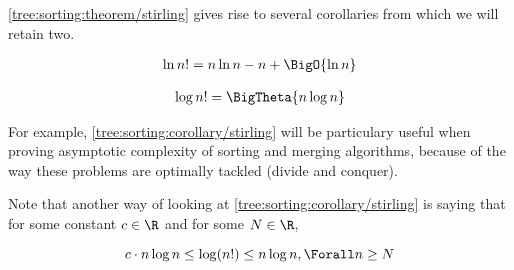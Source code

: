 \ref{tree:sorting:theorem/stirling} gives rise to several corollaries from
which we will retain two.

\begin{corollary}
\begin{align*}
\ln n! &= n \ln n - n + \BigO{\ln n}\\
\end{align*}
\end{corollary}

\begin{corollary}
\label{tree:sorting:corollary/stirling}
\begin{align*}
\log n! &= \BigTheta{n \log n}\\
\end{align*}
\end{corollary}


For example, \ref{tree:sorting:corollary/stirling} will be particulary useful
when proving asymptotic complexity of sorting and merging algorithms, because
of the way these problems are optimally tackled (divide and conquer).

Note that another way of looking at \ref{tree:sorting:corollary/stirling} is
saying that for some constant $c \in \R$ and for some $N \in \R$,

\begin{displaymath}
c \cdot n \log n \leq \log(n!) \leq n \log n, \Forall n \geq N
\end{displaymath}

